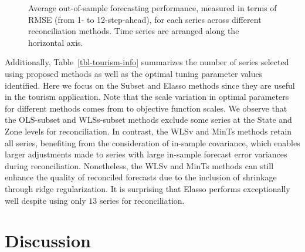 \documentclass[
  11pt]{article}
\theoremstyle{plain}
\theoremstyle{remark}
\begin{document}
\begin{figure}[!t]


\caption{\label{fig-tourism-rmse}Average out-of-sample forecasting
performance, measured in terms of RMSE (from 1- to 12-step-ahead), for
each series across different reconciliation methods. Time series are
arranged along the horizontal axis.}

\end{figure}%

Additionally, Table~\ref{tbl-tourism-info} summarizes the number of
series selected using proposed methods as well as the optimal tuning
parameter values identified. Here we focus on the Subset and Elasso
methods since they are useful in the tourism application. Note that the
scale variation in optimal parameters for different methods comes from
to objective function scales. We observe that the OLS-subset and
WLSs-subset methods exclude some series at the State and Zone levels for
reconciliation. In contrast, the WLSv and MinTs methods retain all
series, benefiting from the consideration of in-sample covariance, which
enables larger adjustments made to series with large in-sample forecast
error variances during reconciliation. Nonetheless, the WLSv and MinTs
methods can still enhance the quality of reconciled forecasts due to the
inclusion of shrinkage through ridge regularization. It is surprising
that Elasso performs exceptionally well despite using only \(13\) series
for reconciliation.

\section{Discussion}\label{sec-discussion}

\end{document}
